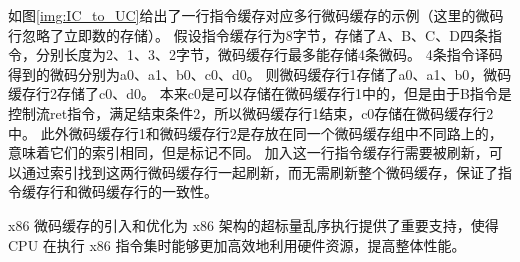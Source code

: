 如图\ref{img:IC_to_UC}给出了一行指令缓存对应多行微码缓存的示例（这里的微码行忽略了立即数的存储）。
假设指令缓存行为8字节，存储了A、B、C、D四条指令，分别长度为2、1、3、2字节，微码缓存行最多能存储4条微码。
4条指令译码得到的微码分别为a0、a1、b0、c0、d0。
则微码缓存行1存储了a0、a1、b0，微码缓存行2存储了c0、d0。
本来c0是可以存储在微码缓存行1中的，但是由于B指令是控制流ret指令，满足结束条件2，所以微码缓存行1结束，c0存储在微码缓存行2中。
此外微码缓存行1和微码缓存行2是存放在同一个微码缓存组中不同路上的，意味着它们的索引相同，但是标记不同。
加入这一行指令缓存行需要被刷新，可以通过索引找到这两行微码缓存行一起刷新，而无需刷新整个微码缓存，保证了指令缓存行和微码缓存行的一致性。

x86 微码缓存的引入和优化为 x86 架构的超标量乱序执行提供了重要支持，使得 CPU 在执行 x86 指令集时能够更加高效地利用硬件资源，提高整体性能。








